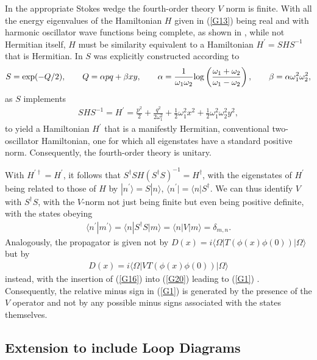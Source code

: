 \documentclass[aps]{revtex4}
\begin{document}
In the appropriate Stokes wedge the fourth-order theory $V$ norm is finite. With all the energy eigenvalues of the Hamiltonian $H$ given in (\ref{G13}) being real and with harmonic oscillator wave functions being complete, as shown in \cite{Bender2008a,Bender2008b}, while not Hermitian itself, $H$ must be similarity equivalent to a Hamiltonian $H^{\prime}=SHS^{-1}$ that is Hermitian. In \cite{Bender2008a,Bender2008b} $S$ was explicitly constructed according to
%
\begin{eqnarray}
S=\exp(-Q/2),\qquad Q=\alpha pq+\beta xy,\qquad \alpha=\frac{1}{\omega_1\omega_2}{\rm log}\left(\frac{\omega_1+\omega_2}{\omega_1-\omega_2}\right),\qquad \beta=\alpha\omega_1^2\omega_2^2,
\label{G17}
\end{eqnarray}
%
as $S$ implements
%
\begin{eqnarray}
SHS^{-1}=H^{\prime}=\frac{p^2}{2}+\frac{q^2}{2\omega_1^2}+
\frac{1}{2}\omega_1^2x^2+\frac{1}{2}\omega_1^2\omega_2^2y^2,
\label{G18}
\end{eqnarray}
%
to yield a Hamiltonian $H^{\prime}$ that is a manifestly Hermitian, conventional two-oscillator Hamiltonian, one for which all eigenstates have a  standard positive norm. Consequently,  the fourth-order theory is unitary.

With $H^{\prime\dagger}=H^{\prime}$, it follows that $S^{\dagger}SH(S^{\dagger}S)^{-1}=H^{\dagger}$, with the eigenstates of $H^{\prime}$ being related to those of $H$ by $|n^{\prime}\rangle =S|n\rangle$, $\langle n^{\prime}|=\langle n|S^{\dagger}$. We can thus identify $V$ with $S^{\dagger}S$, with the $V$-norm not just being finite but even being positive definite, with the states obeying 
%
\begin{eqnarray}
\langle n^{\prime}|m^{\prime} \rangle=\langle n|S^{\dagger}S|m \rangle=\langle n|V|m \rangle=\delta_{m,n}.
\label{G19}
\end{eqnarray}
%
Analogously, the propagator is given not by $D(x)=i\langle \Omega|T(\phi(x)\phi(0))|\Omega\rangle$ but by
%
\begin{eqnarray}
D(x)=i\langle \Omega|VT(\phi(x)\phi(0))|\Omega\rangle
\label{G20}
\end{eqnarray}
%
instead, with the insertion of (\ref{G16}) into (\ref{G20}) leading to (\ref{G1}) \cite{Bender2008b}. Consequently, the relative minus sign in (\ref{G1}) is generated by the presence of the $V$ operator and not by any possible minus signs associated with the states themselves. 

\subsection{Extension to include Loop Diagrams}
\end{document}
